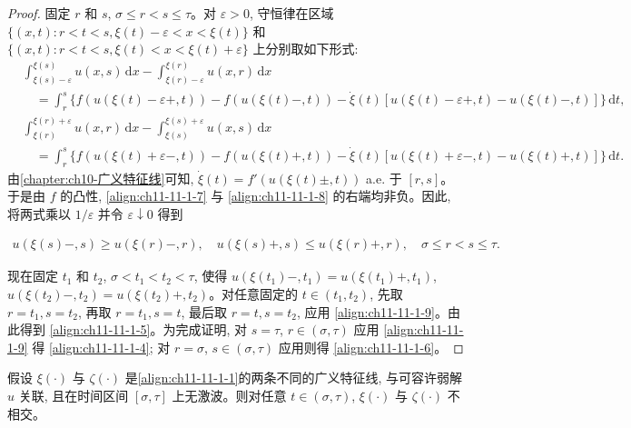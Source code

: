 \documentclass[../../main.tex]{subfiles}
\begin{document}
\begin{proof}
固定 $r$ 和 $s$, $\sigma\leqslant r<s\leqslant\tau$。对 $\varepsilon>0$, 守恒律在区域 $\{(x,t):r<t<s,\xi(t)-\varepsilon<x<\xi(t)\}$ 和 $\{(x,t):r<t<s,\xi(t)<x<\xi(t)+\varepsilon\}$ 上分别取如下形式:
\begin{align}
&\int_{\xi(s)-\varepsilon}^{\xi(s)}u(x,s)\,\mathrm{d}x-\int_{\xi(r)-\varepsilon}^{\xi(r)}u(x,r)\,\mathrm{d}x\nonumber\\
&\quad=\int_r^s\{f(u(\xi(t)-\varepsilon+,t))-f(u(\xi(t)-,t))-\dot{\xi}(t)[u(\xi(t)-\varepsilon+,t)-u(\xi(t)-,t)]\}\,\mathrm{d}t,\label{align:ch11-11-1-7}
\end{align}
\begin{align}
&\int_{\xi(r)}^{\xi(r)+\varepsilon}u(x,r)\,\mathrm{d}x-\int_{\xi(s)}^{\xi(s)+\varepsilon}u(x,s)\,\mathrm{d}x\nonumber\\
&\quad=\int_r^s\{f(u(\xi(t)+\varepsilon-,t))-f(u(\xi(t)+,t))-\dot{\xi}(t)[u(\xi(t)+\varepsilon-,t)-u(\xi(t)+,t)]\}\,\mathrm{d}t.\label{align:ch11-11-1-8}
\end{align}
由\cref{chapter:ch10-广义特征线}可知, $\dot{\xi}(t)=f'(u(\xi(t)\pm,t))$ a.e. 于 $[r,s]$。于是由 $f$ 的凸性, \eqref{align:ch11-11-1-7} 与 \eqref{align:ch11-11-1-8} 的右端均非负。因此, 将两式乘以 $1/\varepsilon$ 并令 $\varepsilon\downarrow0$ 得到

\begin{align}
u(\xi(s)-,s)\geqslant u(\xi(r)-,r),\quad u(\xi(s)+,s)\leqslant u(\xi(r)+,r),\quad \sigma\leqslant r<s\leqslant\tau.\label{align:ch11-11-1-9}
\end{align}

现在固定 $t_1$ 和 $t_2$, $\sigma<t_1<t_2<\tau$, 使得 $u(\xi(t_1)-,t_1)=u(\xi(t_1)+,t_1)$, $u(\xi(t_2)-,t_2)=u(\xi(t_2)+,t_2)$。对任意固定的 $t\in(t_1,t_2)$, 先取 $r=t_1,s=t_2$, 再取 $r=t_1,s=t$, 最后取 $r=t,s=t_2$, 应用 \eqref{align:ch11-11-1-9}。由此得到 \eqref{align:ch11-11-1-5}。为完成证明, 对 $s=\tau$, $r\in(\sigma,\tau)$ 应用 \eqref{align:ch11-11-1-9} 得 \eqref{align:ch11-11-1-4}; 对 $r=\sigma$, $s\in(\sigma,\tau)$ 应用则得 \eqref{align:ch11-11-1-6}。
\end{proof}

\begin{corollary}\label{corollary:ch11-11-2}
假设 $\xi(\cdot)$ 与 $\zeta(\cdot)$ 是\eqref{align:ch11-11-1-1}的两条不同的广义特征线, 与可容许弱解 $u$ 关联, 且在时间区间 $[\sigma,\tau]$ 上无激波。则对任意 $t\in(\sigma,\tau)$, $\xi(\cdot)$ 与 $\zeta(\cdot)$ 不相交。
\end{corollary}
\end{document}
